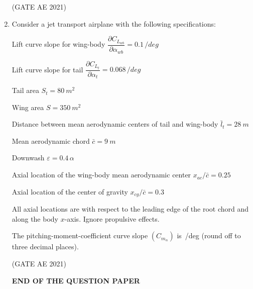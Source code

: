 \documentclass[journal,12pt,onecolumn]{IEEEtran}
\theoremstyle{remark}
\begin{document}
\begin{flushleft}
\begin{enumerate}
\hfill (GATE AE 2021)

\item 
Consider a jet transport airplane with the following specifications:

Lift curve slope for wing-body $\dfrac{\partial C_{L_{wb}}}{\partial \alpha_{wb}} = 0.1 \,/deg$

Lift curve slope for tail $\dfrac{\partial C_{L_t}}{\partial \alpha_t} = 0.068 \,/deg$

Tail area $S_t = 80~m^{2}$

Wing area $S = 350~m^{2}$

Distance between mean aerodynamic centers of tail and wing-body $\bar{l}_t = 28~m$

Mean aerodynamic chord $\bar{c} = 9~m$

Downwash $\varepsilon = 0.4\,\alpha$

Axial location of the wing-body mean aerodynamic center $x_{ac}/\bar{c} = 0.25$

Axial location of the center of gravity $x_{cg}/\bar{c} = 0.3$

All axial locations are with respect to the leading edge of the root chord and along the body $x$-axis. Ignore propulsive effects.

The pitching-moment-coefficient curve slope $(C_{m_\alpha})$ is \underline{\hfill} \,/deg (round off to three decimal places).

\hfill (GATE AE 2021)
\begin{center}
    \large\textbf{END OF THE QUESTION PAPER}
\end{center}

\end{enumerate}
\end{flushleft}
\end{document}

